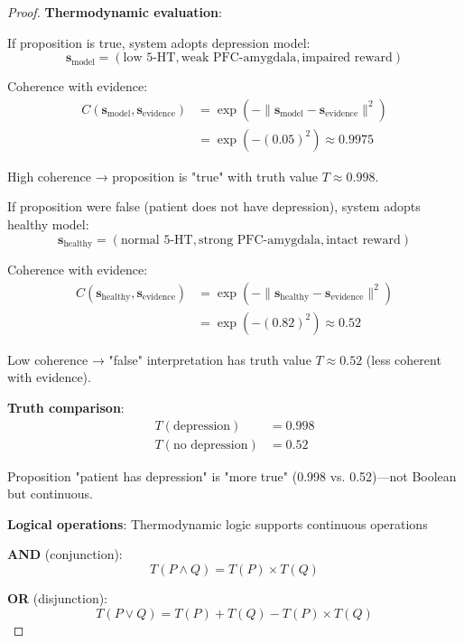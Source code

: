 \begin{proof}
\textbf{Thermodynamic evaluation}:

If proposition is true, system adopts depression model:
\begin{equation}
\mathbf{s}_{\text{model}} = (\text{low 5-HT}, \text{weak PFC-amygdala}, \text{impaired reward})
\end{equation}

Coherence with evidence:
\begin{align}
C(\mathbf{s}_{\text{model}}, \mathbf{s}_{\text{evidence}}) &= \exp(-\|\mathbf{s}_{\text{model}} - \mathbf{s}_{\text{evidence}}\|^2) \\
&= \exp(-(0.05)^2) \approx 0.9975
\end{align}

High coherence → proposition is "true" with truth value $T \approx 0.998$.

If proposition were false (patient does not have depression), system adopts healthy model:
\begin{equation}
\mathbf{s}_{\text{healthy}} = (\text{normal 5-HT}, \text{strong PFC-amygdala}, \text{intact reward})
\end{equation}

Coherence with evidence:
\begin{align}
C(\mathbf{s}_{\text{healthy}}, \mathbf{s}_{\text{evidence}}) &= \exp(-\|\mathbf{s}_{\text{healthy}} - \mathbf{s}_{\text{evidence}}\|^2) \\
&= \exp(-(0.82)^2) \approx 0.52
\end{align}

Low coherence → "false" interpretation has truth value $T \approx 0.52$ (less coherent with evidence).

\textbf{Truth comparison}:
\begin{align}
T(\text{depression}) &= 0.998 \\
T(\text{no depression}) &= 0.52
\end{align}

Proposition "patient has depression" is "more true" (0.998 vs. 0.52)—not Boolean but continuous.

\textbf{Logical operations}: Thermodynamic logic supports continuous operations

\textbf{AND} (conjunction):
\begin{equation}
T(P \wedge Q) = T(P) \times T(Q)
\end{equation}

\textbf{OR} (disjunction):
\begin{equation}
T(P \vee Q) = T(P) + T(Q) - T(P) \times T(Q)
\end{equation}


\end{proof}
